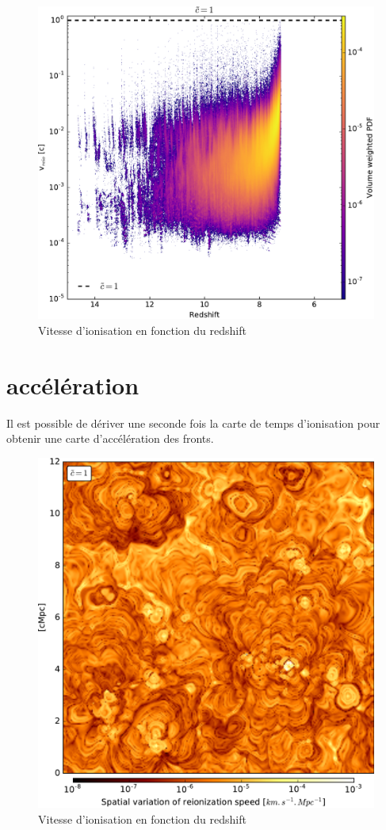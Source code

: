 \begin{figure}[htpb]
        \includegraphics[width=.95\linewidth]{img/04_mapreio/speedreio_z_c1.pdf} 
        \caption{Vitesse d'ionisation en fonction du redshift
        }
 		\label{fig:speedz}
\end{figure}


\section{accélération}
Il est possible de dériver une seconde fois la carte de temps d'ionisation pour obtenir une carte d'accélération des fronts.

\begin{figure}[htpb]
        \includegraphics[width=.95\linewidth]{img/04_mapreio/map_acc_c1.pdf} 
        \caption{Vitesse d'ionisation en fonction du redshift
        }
 		\label{fig:speedz}
\end{figure}



